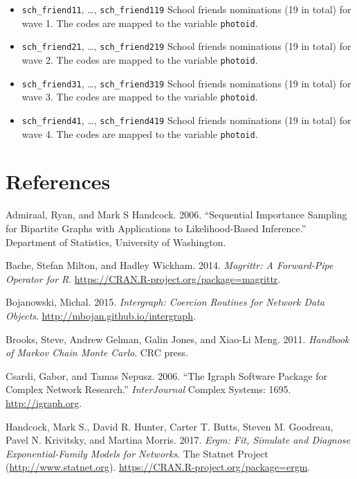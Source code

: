 \documentclass[]{book}
\theoremstyle{definition}
\theoremstyle{definition}
\theoremstyle{definition}
\theoremstyle{remark}
\begin{document}
\begin{itemize}
\item
  \texttt{sch\_friend11}, \ldots{}, \texttt{sch\_friend119} School
  friends nominations (19 in total) for wave 1. The codes are mapped to
  the variable \texttt{photoid}.
\item
  \texttt{sch\_friend21}, \ldots{}, \texttt{sch\_friend219} School
  friends nominations (19 in total) for wave 2. The codes are mapped to
  the variable \texttt{photoid}.
\item
  \texttt{sch\_friend31}, \ldots{}, \texttt{sch\_friend319} School
  friends nominations (19 in total) for wave 3. The codes are mapped to
  the variable \texttt{photoid}.
\item
  \texttt{sch\_friend41}, \ldots{}, \texttt{sch\_friend419} School
  friends nominations (19 in total) for wave 4. The codes are mapped to
  the variable \texttt{photoid}.
\end{itemize}



\chapter*{References}\label{references}

\hypertarget{refs}{}
\hypertarget{ref-admiraal2006}{}
Admiraal, Ryan, and Mark S Handcock. 2006. ``Sequential Importance
Sampling for Bipartite Graphs with Applications to Likelihood-Based
Inference.'' Department of Statistics, University of Washington.

\hypertarget{ref-R-magrittr}{}
Bache, Stefan Milton, and Hadley Wickham. 2014. \emph{Magrittr: A
Forward-Pipe Operator for R}.
\url{https://CRAN.R-project.org/package=magrittr}.

\hypertarget{ref-R-intergraph}{}
Bojanowski, Michal. 2015. \emph{Intergraph: Coercion Routines for
Network Data Objects}. \url{http://mbojan.github.io/intergraph}.

\hypertarget{ref-brooks2011}{}
Brooks, Steve, Andrew Gelman, Galin Jones, and Xiao-Li Meng. 2011.
\emph{Handbook of Markov Chain Monte Carlo}. CRC press.

\hypertarget{ref-R-igraph}{}
Csardi, Gabor, and Tamas Nepusz. 2006. ``The Igraph Software Package for
Complex Network Research.'' \emph{InterJournal} Complex Systems: 1695.
\url{http://igraph.org}.

\hypertarget{ref-R-ergm}{}
Handcock, Mark S., David R. Hunter, Carter T. Butts, Steven M. Goodreau,
Pavel N. Krivitsky, and Martina Morris. 2017. \emph{Ergm: Fit, Simulate
and Diagnose Exponential-Family Models for Networks}. The Statnet
Project (\url{http://www.statnet.org}).
\url{https://CRAN.R-project.org/package=ergm}.
\end{document}
